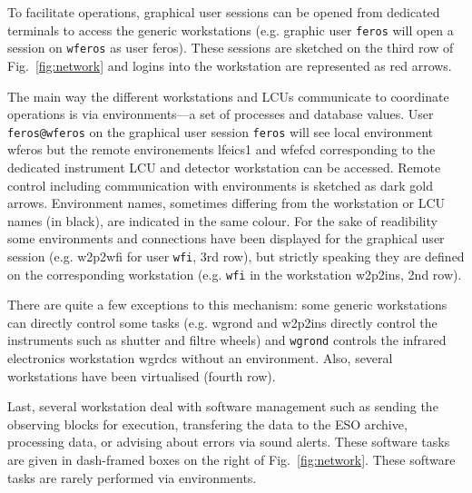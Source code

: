 \documentclass[11pt,fleqn,a4paper]{book}
\begin{document}
To facilitate operations, graphical user sessions can be opened from dedicated terminals to access the generic workstations (e.g. graphic user \texttt{feros} will open a session on \texttt{wferos} as user feros).  These sessions are sketched on the third row of Fig.~\ref{fig:network} and logins into the workstation are represented as red arrows.

The main way the different workstations and LCUs communicate to coordinate operations is via \glspl{environment}---a set of processes and database values.  User \texttt{feros@wferos} on the graphical user session \texttt{feros} will see local environment \gls{wferos} but the remote environements \gls{lfeics1} and \gls{wfefcd} corresponding to the dedicated instrument LCU and detector workstation can be accessed.  Remote control including communication with environments is sketched as dark gold arrows. Environment names, sometimes differing from the workstation or LCU names (in black), are indicated in the same colour.  For the sake of readibility some environments and connections have been displayed for the graphical user session (e.g. \gls{w2p2wfi} for user \texttt{wfi}, 3rd row), but strictly speaking they are defined on the corresponding workstation (e.g. \texttt{wfi} in the workstation \gls{w2p2ins}, 2nd row).

There are quite a few exceptions to this mechanism: some generic workstations can directly control some tasks (e.g. \gls{wgrond} and \gls{w2p2ins} directly control the instruments such as shutter and filtre wheels) and \texttt{wgrond} controls the infrared electronics workstation \gls{wgrdcs} without an environment. Also, several workstations have been virtualised (fourth row).

Last, several workstation deal with software management such as sending the observing blocks for execution, transfering the data to the ESO archive, processing data, or advising about errors via sound alerts.  These software tasks are given in dash-framed boxes on the right of Fig.~\ref{fig:network}.  These software tasks are rarely performed via environments.
\end{document}
